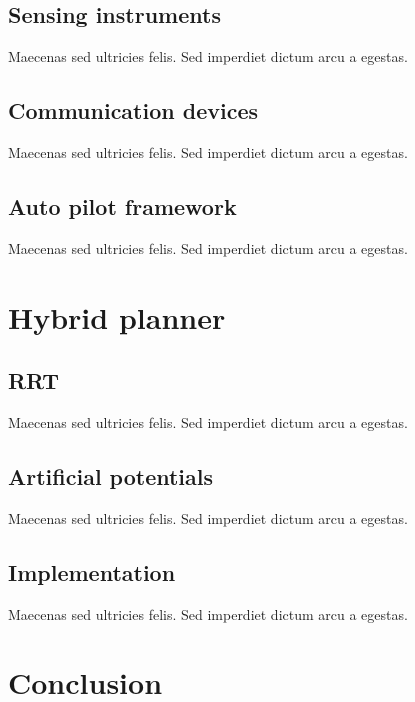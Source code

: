 \documentclass[oneside,onecolumn]{article}
\begin{document}
\subsection{Sensing instruments}
Maecenas sed ultricies felis. Sed imperdiet dictum arcu a egestas. 
\subsection{Communication devices}
Maecenas sed ultricies felis. Sed imperdiet dictum arcu a egestas. 
\subsection{Auto pilot framework}
Maecenas sed ultricies felis. Sed imperdiet dictum arcu a egestas. 
\section{Hybrid planner}

\subsection{RRT}
Maecenas sed ultricies felis. Sed imperdiet dictum arcu a egestas. 
\subsection{Artificial potentials}
Maecenas sed ultricies felis. Sed imperdiet dictum arcu a egestas. 
\subsection{Implementation}
Maecenas sed ultricies felis. Sed imperdiet dictum arcu a egestas. 



\section{Conclusion}

\end{document}
